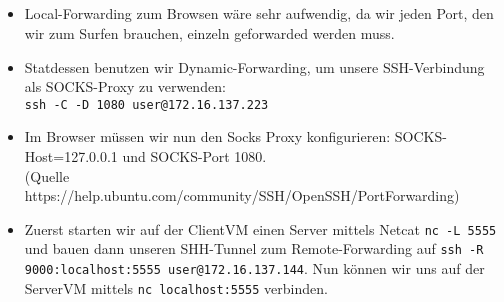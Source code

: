 \documentclass{scrartcl}
\begin{document}
\begin{enumerate}[\bfseries 1.]
	\subsection{}
	\label{sub:4.3}
	\begin{itemize}
		\item Local-Forwarding zum Browsen wäre sehr aufwendig, da wir jeden Port, den
		      wir zum Surfen brauchen, einzeln geforwarded werden muss.
		\item Statdessen benutzen wir Dynamic-Forwarding, um unsere SSH-Verbindung als
		      SOCKS-Proxy zu verwenden: \\
		      \texttt{ssh -C -D 1080 user@172.16.137.223}\\
		\item Im Browser müssen wir nun den Socks Proxy konfigurieren:
		      SOCKS-Host=127.0.0.1 und SOCKS-Port 1080.\\
		      (Quelle https://help.ubuntu.com/community/SSH/OpenSSH/PortForwarding)

		\item
		      Zuerst starten wir auf der ClientVM einen Server mittels Netcat
		      \texttt{nc -L 5555} und bauen dann unseren SHH-Tunnel zum Remote-Forwarding
		      auf \texttt{ssh -R 9000:localhost:5555 user@172.16.137.144}. Nun können wir uns
		      auf der ServerVM mittels \texttt{nc localhost:5555} verbinden.
    \end{itemize}
  \end{enumerate}
\end{document}
